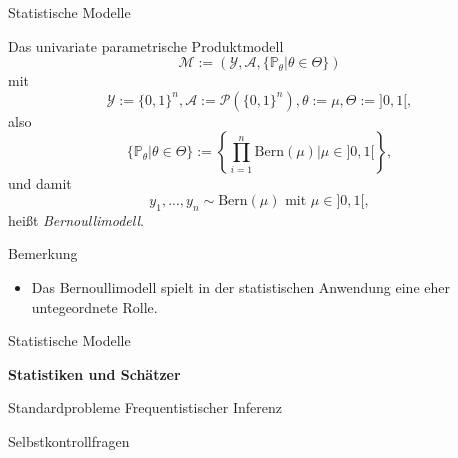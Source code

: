 \documentclass[
  8pt,
  ignorenonframetext,
]{beamer}
\providecommand{\tightlist}{%
  \setlength{\itemsep}{0pt}\setlength{\parskip}{0pt}}
\begin{document}
\begin{frame}{Statistische Modelle}
\protect\hypertarget{statistische-modelle-3}{}
\footnotesize
\begin{definition}[Bernoullimodell]
Das univariate parametrische Produktmodell
\begin{equation}
\mathcal{M} := \left(\mathcal{Y}, \mathcal{A}, \{\mathbb{P}_\theta|\theta \in \Theta\}\right)
\end{equation}
mit
\begin{equation}
\mathcal{Y} := \{0,1\}^n, \mathcal{A} := \mathcal{P}\left(\{0,1\}^n\right), \theta:= \mu, \Theta := ]0,1[,
\end{equation}
also
\begin{equation}
\{\mathbb{P}_\theta|\theta \in \Theta\} := \left\lbrace \prod_{i=1}^n \mbox{Bern}(\mu)|\mu \in ]0,1[ \right\rbrace,
\end{equation}
und damit
\begin{equation}
y_1,...,y_n \sim \mbox{Bern}(\mu) \mbox{ mit } \mu \in ]0,1[,
\end{equation}
heißt \textit{Bernoullimodell}.
\end{definition}

\footnotesize

Bemerkung

\begin{itemize}
\tightlist
\item
  Das Bernoullimodell spielt in der statistischen Anwendung eine eher
  untegeordnete Rolle.
\end{itemize}
\end{frame}

\begin{frame}{}
\protect\hypertarget{section-6}{}
\large
{}
\vfill

Statistische Modelle

\textbf{Statistiken und Schätzer}

Standardprobleme Frequentistischer Inferenz

Selbstkontrollfragen \vfill
\end{frame}
\end{document}
